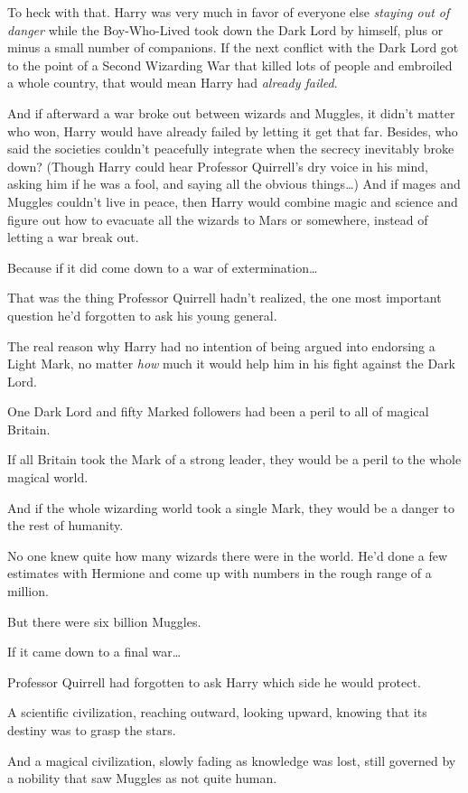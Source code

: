 To heck with that. Harry was very much in favor of everyone else \emph{staying
out of danger} while the Boy-Who-Lived took down the Dark Lord by himself, plus
or minus a small number of companions. If the next conflict with the Dark Lord
got to the point of a Second Wizarding War that killed lots of people and
embroiled a whole country, that would mean Harry had \emph{already failed}.

And if afterward a war broke out between wizards and Muggles, it didn't matter
who won, Harry would have already failed by letting it get that far. Besides,
who said the societies couldn't peacefully integrate when the secrecy
inevitably broke down? (Though Harry could hear Professor Quirrell's dry voice
in his mind, asking him if he was a fool, and saying all the obvious
things{\ldots}) And if mages and Muggles couldn't live in peace, then Harry
would combine magic and science and figure out how to evacuate all the wizards
to Mars or somewhere, instead of letting a war break out.

Because if it did come down to a war of extermination{\ldots}

That was the thing Professor Quirrell hadn't realized, the one most important
question he'd forgotten to ask his young general.

The real reason why Harry had no intention of being argued into endorsing a
Light Mark, no matter \emph{how} much it would help him in his fight against
the Dark Lord.

One Dark Lord and fifty Marked followers had been a peril to all of magical
Britain.

If all Britain took the Mark of a strong leader, they would be a peril to the
whole magical world.

And if the whole wizarding world took a single Mark, they would be a danger to
the rest of humanity.

No one knew quite how many wizards there were in the world. He'd done a few
estimates with Hermione and come up with numbers in the rough range of a
million.

But there were six billion Muggles.

If it came down to a final war{\ldots}

Professor Quirrell had forgotten to ask Harry which side he would protect.

A scientific civilization, reaching outward, looking upward, knowing that its
destiny was to grasp the stars.

And a magical civilization, slowly fading as knowledge was lost, still governed
by a nobility that saw Muggles as not quite human.


